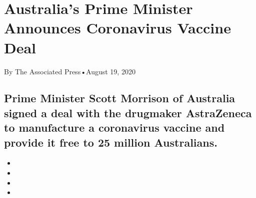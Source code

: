 \hypertarget{australias-prime-minister-announces-coronavirus-vaccine-deal-1}{%
\section{Australia's Prime Minister Announces Coronavirus Vaccine
Deal}\label{australias-prime-minister-announces-coronavirus-vaccine-deal-1}}

By The Associated Press•August 19, 2020

\hypertarget{prime-minister-scott-morrison-of-australia-signed-a-deal-with-the-drugmaker-astrazeneca-to-manufacture-a-coronavirus-vaccine-and-provide-it-free-to-25-million-australians-1}{%
\subsection{Prime Minister Scott Morrison of Australia signed a deal
with the drugmaker AstraZeneca to manufacture a coronavirus vaccine and
provide it free to 25 million
Australians.}\label{prime-minister-scott-morrison-of-australia-signed-a-deal-with-the-drugmaker-astrazeneca-to-manufacture-a-coronavirus-vaccine-and-provide-it-free-to-25-million-australians-1}}

\begin{itemize}
\item
\item
\item
\item
\end{itemize}

